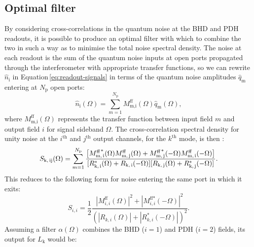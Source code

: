 \subsection{\label{sec:optimal-filter}Optimal filter}

By considering cross-correlations in the quantum noise at the \gls{BHD} and \gls{PDH} readouts, it is possible to produce an optimal filter with which to combine the two in such a way as to minimise the total noise spectral density. The noise at each readout is the sum of the quantum noise inputs at open ports propagated through the interferometer with appropriate transfer functions, so we can rewrite $\hat{n}_{\textrm{i}}$ in Equation\,\ref{eq:readout-signals} in terms of the quantum noise amplitudes $\hat{q}_{\textrm{m}}$ entering at $N_{\textrm{p}}$ open ports:
\begin{equation}
  \hat{n}_{\textrm{i}} \left( \Omega \right) = \sum_{m=1}^{N_{\textrm{p}}} M^{\textrm{ff}}_{\textrm{m,i}}\left( \Omega \right) \hat{q}_{\textrm{m}} \left( \Omega \right),
\end{equation}
where $M^{\textrm{ff}}_{\textrm{m,i}}\left( \Omega \right)$ represents the transfer function between input field $m$ and output field $i$ for signal sideband $\Omega$. The cross-correlation spectral density for unity noise at the $i^{\textrm{th}}$ and $j^{\textrm{th}}$ output channels, for the $k^{\textrm{th}}$ mode, is then \cite{Danilishin2012}:
\begin{equation}
  \begin{split}
    S_{\textrm{k,\,ij}}(\Omega) = \sum_{m=1}^{N_{\textrm{p}}} \dfrac{\left[M^{\textrm{ff\,*}}_{\textrm{m,\,i}}(\Omega)M^{\textrm{ff}}_{\textrm{m,\,j}}(\Omega)+M^{\textrm{ff\,*}}_{\textrm{m,\,j}}(-\Omega)M^{\textrm{ff}}_{\textrm{m,\,i}}(-\Omega)\right]}{[R^*_{\textrm{k,\,i}}(\Omega)+R_{\textrm{k,\,i}}(-\Omega)][R_{\textrm{k,\,j}}(\Omega)+R^*_{\textrm{k,\,j}}(-\Omega)]}.
  \end{split}
\end{equation}
This reduces to the following form for noise entering the same port in which it exits:
\begin{equation}
  S_{i,i} = \frac{1}{2} \frac{\left| M^{\textrm{ff}}_{i,i}\left( \Omega \right) \right|^{2} + \left| M^{\textrm{ff}*}_{i,i}\left( -\Omega \right) \right|^{2}}{\left(\left| R^{ }_{k,i}\left( \Omega \right) \right| + \left| R^*_{k,i}\left(-\Omega\right)\right|\right)^{2}}.
\end{equation}
Assuming a filter $\alpha\left( \Omega \right)$ combines the BHD ($i = 1$) and PDH ($i = 2$) fields, its output for $L_{\textrm{k}}$ would be:
